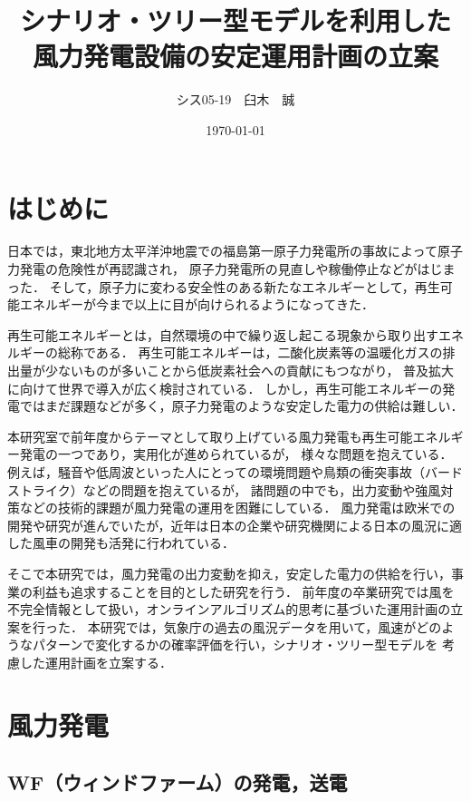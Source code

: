 \documentclass[a4paper,12pt,showkeys]{jreport}
\title{シナリオ・ツリー型モデルを利用した\\風力発電設備の安定運用計画の立案}
\author{シス05-19　臼木　誠}
\date{\today}
\begin{document}
\maketitle
\setcounter{tocdepth}{2}

\tableofcontents
\newpage
{}

\chapter{はじめに}

日本では，東北地方太平洋沖地震での福島第一原子力発電所の事故によって原子力発電の危険性が再認識され，
原子力発電所の見直しや稼働停止などがはじまった．
そして，原子力に変わる安全性のある新たなエネルギーとして，再生可能エネルギーが今まで以上に目が向けられるようになってきた．

再生可能エネルギーとは，自然環境の中で繰り返し起こる現象から取り出すエネルギーの総称である．
再生可能エネルギーは，二酸化炭素等の温暖化ガスの排出量が少ないものが多いことから低炭素社会への貢献にもつながり，
普及拡大に向けて世界で導入が広く検討されている．
しかし，再生可能エネルギーの発電ではまだ課題などが多く，原子力発電のような安定した電力の供給は難しい．

本研究室で前年度からテーマとして取り上げている風力発電も再生可能エネルギー発電の一つであり，実用化が進められているが，
様々な問題を抱えている．
例えば，騒音や低周波といった人にとっての環境問題や鳥類の衝突事故（バードストライク）などの問題を抱えているが，
諸問題の中でも，出力変動や強風対策などの技術的課題が風力発電の運用を困難にしている．
風力発電は欧米での開発や研究が進んでいたが，近年は日本の企業や研究機関による日本の風況に適した風車の開発も活発に行われている．

そこで本研究では，風力発電の出力変動を抑え，安定した電力の供給を行い，事業の利益も追求することを目的とした研究を行う．
前年度の卒業研究\cite{徳谷}では風を不完全情報として扱い，オンラインアルゴリズム的思考に基づいた運用計画の立案を行った．
本研究では，気象庁の過去の風況データを用いて，風速がどのようなパターンで変化するかの確率評価を行い，シナリオ・ツリー型モデルを
考慮した運用計画を立案する．

\newpage
\chapter{風力発電}
\section{WF（ウィンドファーム）の発電，送電}
\end{document}
